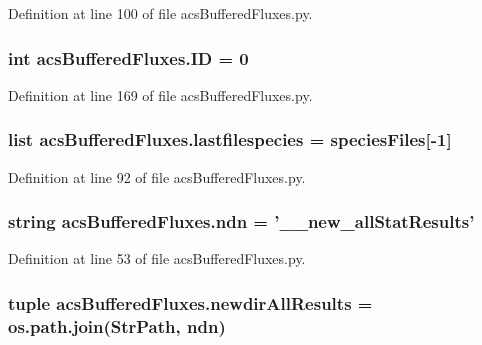Definition at line 100 of file acs\-Buffered\-Fluxes.\-py.

\hypertarget{a00092_a111fff157346d1e3888a229584206d0a}{
\subsubsection[{I\-D}]{\setlength{\rightskip}{0pt plus 5cm}int acs\-Buffered\-Fluxes.\-I\-D = 0}}\label{a00092_a111fff157346d1e3888a229584206d0a}


Definition at line 169 of file acs\-Buffered\-Fluxes.\-py.

\hypertarget{a00092_a887b4124ed717643d4e79b6d9597109f}{
\subsubsection[{lastfilespecies}]{\setlength{\rightskip}{0pt plus 5cm}list acs\-Buffered\-Fluxes.\-lastfilespecies = {\bf species\-Files}\mbox{[}-\/1\mbox{]}}}\label{a00092_a887b4124ed717643d4e79b6d9597109f}


Definition at line 92 of file acs\-Buffered\-Fluxes.\-py.

\hypertarget{a00092_a5df7e71a36351afd3e59d6f50a94bdaf}{
\subsubsection[{ndn}]{\setlength{\rightskip}{0pt plus 5cm}string acs\-Buffered\-Fluxes.\-ndn = '\-\_\-\_\-new\-\_\-all\-Stat\-Results'}}\label{a00092_a5df7e71a36351afd3e59d6f50a94bdaf}


Definition at line 53 of file acs\-Buffered\-Fluxes.\-py.

\hypertarget{a00092_ae53bd92b0509a8f35e92e734a7f4b4e1}{
\subsubsection[{newdir\-All\-Results}]{\setlength{\rightskip}{0pt plus 5cm}tuple acs\-Buffered\-Fluxes.\-newdir\-All\-Results = os.\-path.\-join(Str\-Path, {\bf ndn})}}\label{a00092_ae53bd92b0509a8f35e92e734a7f4b4e1}


